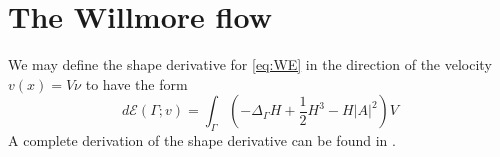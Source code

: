 

\section{The Willmore flow}%
\label{sec:evolutionary_pde_s_of_the_willmore_flow}

We may define the shape derivative for \eqref{eq:WE} in the direction of the velocity $v\left( x \right)  = V \nu  $  to have the form \[
d\mathcal{E} \left( \Gamma; v  \right)  = \int_{\Gamma }^{} \left( - \Delta _{\Gamma } H + \frac{1}{2} H^{3} - H \left\lvert A \right\rvert^2  \right) V
\]
A complete derivation of the shape derivative can be found in \cite[Corally 4.7]{dougan2012first}.










